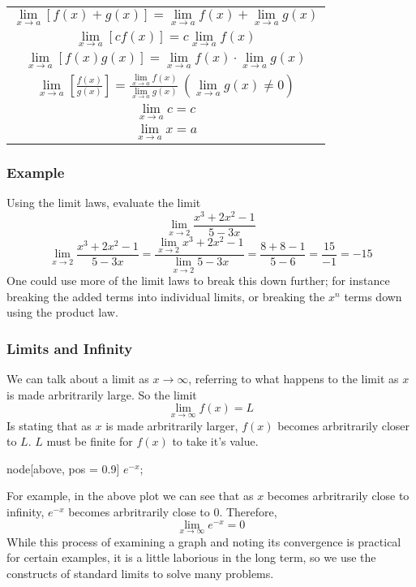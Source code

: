 \documentclass[12pt]{report}
\newenvironment{formulalist}{
    \renewcommand{\arraystretch}{2}
    \begin{center}    
        \begin{tabular}{||c||}
}{
        \end{tabular}
    \end{center}
    \renewcommand{\arraystretch}{1}
}
\newcommand{\limit}{\lim\limits}
\begin{document}
\begin{flushleft}
\begin{formulalist}
    \(\limit_{x\rightarrow a}\left[f(x) + g(x)\right]
    = \limit_{x\rightarrow a} f(x) 
    + \limit_{x\rightarrow a} g(x)\) \\ 
    \(\limit_{x \rightarrow a}\left[cf(x)\right] 
    = c\limit_{x \rightarrow a}f(x)\) \\ 
    \(\limit_{x \rightarrow a}\left[f(x)g(x)\right] 
    = \limit_{x \rightarrow a}f(x) \cdot
    \limit_{x \rightarrow a}g(x)\) \\ 
    \(\limit_{x \rightarrow a}\left[\frac{f(x)}{g(x)}\right] 
    = \frac{\limit_{x \rightarrow a}f(x)}{
    \limit_{x \rightarrow a}g(x)} 
    \:\left(\limit_{x \rightarrow a}g(x) \neq 0\right)\) \\ 
    \(\limit_{x \rightarrow a} c = c\) \\ 
    \(\limit_{x \rightarrow a} x = a\) \\ 
\end{formulalist}

\subsubsection*{Example}
Using the limit laws, evaluate the limit
\[\lim_{x\rightarrow2}\frac{x^3 + 2x^2 - 1}{5 - 3x}\]
\[\lim_{x\rightarrow2}\frac{x^3 + 2x^2 - 1}{5 - 3x} 
= \frac{\limit_{x\rightarrow2} x^3 + 2x^2 - 1}{
\limit_{x\rightarrow2} 5 - 3x} = \frac{8 + 8 - 1}{5 - 6} 
= \frac{15}{-1} = -15\]
One could use more of the limit laws to break this down further; for instance
breaking the added terms into individual limits, or breaking the \(x^n\) terms
down using the product law.

\subsubsection*{Limits and Infinity}
We can talk about a limit as \(x\rightarrow\infty\), referring to what happens
to the limit as \(x\) is made arbritrarily large. So the limit
\[\lim_{x\rightarrow\infty} f(x) = L\]
Is stating that as \(x\) is made arbritrarily larger, \(f(x)\) becomes 
arbritrarily closer to \(L\). \(L\) must be finite for \(f(x)\) to take it's
value.

\begin{plot}
    node[above, pos = 0.9] {\(e^{-x}\)};
\end{plot}

For example, in the above plot we can see that as \(x\) becomes arbritrarily 
close to infinity, \(e^{-x}\) becomes arbritrarily close to \(0\). Therefore,
\[\lim_{x\rightarrow\infty} e^{-x} = 0\]
While this process of examining a graph and noting its convergence is practical
for certain examples, it is a little laborious in the long term, so we use the 
constructs of standard limits to solve many problems.


\end{flushleft}
\end{document}
